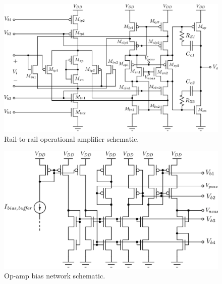 \begin{figure}[!t]
	\centering
	\includegraphics[width=6in]{./Figures/Filter/buffer_post.eps}
	\caption{Rail-to-rail operational amplifier schematic.}\label{fig:buffer_post}
\end{figure}

\begin{figure}[!t]
	\centering
	\includegraphics[width=5in]{./Figures/Filter/bias_buffer_post.eps}
	\caption{Op-amp bias network schematic.}\label{fig:bias_buffer_post}
\end{figure}


